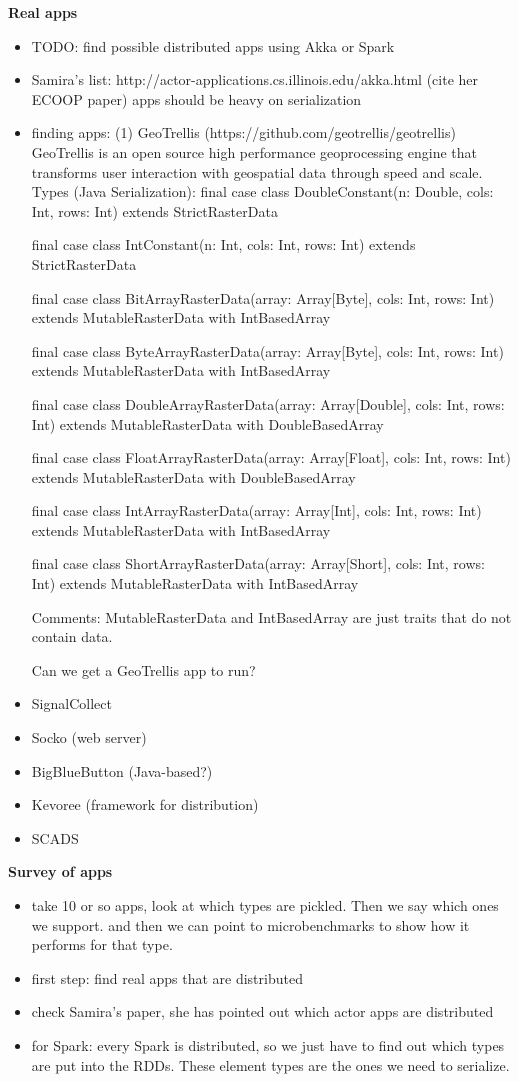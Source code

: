 \documentclass[preprint,10pt]{sigplanconf}
\begin{document}
{\bf Real apps}
\begin{itemize}
\item TODO: find possible distributed apps using Akka or Spark
\item Samira's list: http://actor-applications.cs.illinois.edu/akka.html (cite her ECOOP paper)
apps should be heavy on serialization
\item finding apps:
(1) GeoTrellis (https://github.com/geotrellis/geotrellis)
GeoTrellis is an open source high performance geoprocessing engine that transforms user interaction with geospatial data through speed and scale.
Types (Java Serialization):
final case class DoubleConstant(n: Double, cols: Int, rows: Int) extends StrictRasterData

final case class IntConstant(n: Int, cols: Int, rows: Int) extends StrictRasterData

final case class BitArrayRasterData(array: Array[Byte], cols: Int, rows: Int) extends MutableRasterData with IntBasedArray

final case class ByteArrayRasterData(array: Array[Byte], cols: Int, rows: Int) extends MutableRasterData with IntBasedArray

final case class DoubleArrayRasterData(array: Array[Double], cols: Int, rows: Int) extends MutableRasterData with DoubleBasedArray

final case class FloatArrayRasterData(array: Array[Float], cols: Int, rows: Int) extends MutableRasterData with DoubleBasedArray

final case class IntArrayRasterData(array: Array[Int], cols: Int, rows: Int) extends MutableRasterData with IntBasedArray

final case class ShortArrayRasterData(array: Array[Short], cols: Int, rows: Int) extends MutableRasterData with IntBasedArray

Comments: MutableRasterData and IntBasedArray are just traits that do not contain data.

Can we get a GeoTrellis app to run?

\item SignalCollect
\item Socko (web server)
\item BigBlueButton (Java-based?)
\item Kevoree (framework for distribution)
\item SCADS
\end{itemize}

{\bf Survey of apps}

\begin{itemize}
\item take 10 or so apps, look at which types are pickled. Then we say which ones we support. and then we can point to microbenchmarks to show how it performs for that type.
\item first step: find real apps that are distributed
\item check Samira's paper, she has pointed out which actor apps are distributed
\item for Spark: every Spark is distributed, so we just have to find out which types are put into the RDDs. These element types are the ones we need to serialize.
\end{itemize}
\end{document}

